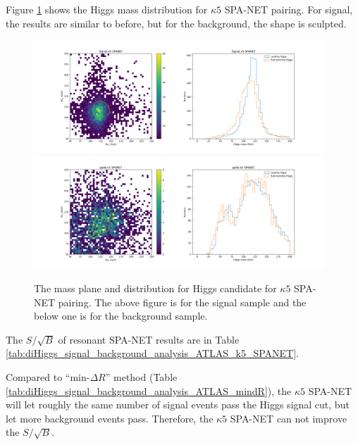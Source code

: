 \documentclass[12pt]{article}
\begin{document}
		Figure \ref{fig:Higgs_mass_new_k5_SPANET} shows the Higgs mass distribution for $\kappa 5$ SPA-NET pairing. For signal, the results are similar to before, but for the background, the shape is sculpted.
		\begin{figure}[htpb]
			\centering
			\includegraphics[width=0.97\textwidth]{Higgs_mass_new_k5-SPANET_s.png}
			\includegraphics[width=0.97\textwidth]{Higgs_mass_new_k5-SPANET_4b.png}
			\caption{The mass plane and distribution for Higgs candidate for $\kappa 5$ SPA-NET pairing. The above figure is for the signal sample and the below one is for the background sample.}
			\label{fig:Higgs_mass_new_k5_SPANET}
		\end{figure}

		The $S / \sqrt{B}$ of resonant SPA-NET results are in Table \ref{tab:diHiggs_signal_background_analysis_ATLAS_k5_SPANET}.

		Compared to ``$\text{min-}\Delta R$'' method (Table \ref{tab:diHiggs_signal_background_analysis_ATLAS_mindR}), the $\kappa 5$ SPA-NET will let roughly the same number of signal events pass the Higgs signal cut, but let more background events pass. Therefore, the $\kappa 5$ SPA-NET can not improve the $S/\sqrt{B}$.
\end{document}

